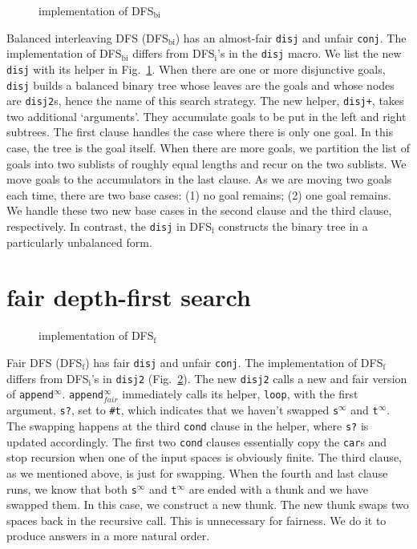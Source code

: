 \documentclass[format=acmlarge, review=true, authordraft=true]{acmart}
\newcommand{\conj}{\texttt{conj}}
\newcommand{\disj}{\texttt{disj}}
\newcommand{\DFSi }[0]{DFS$_\textrm{i}$}
\newcommand{\DFSf }[0]{DFS$_\textrm{f}$}
\newcommand{\DFSbi}[0]{DFS$_\textrm{bi}$}
\begin{document}
\begin{figure}
	
	\caption{implementation of \DFSbi{}}
	\label{balanced-disj}
\end{figure}

Balanced interleaving DFS (\DFSbi{}) has an almost-fair \disj{} and unfair 
\conj{}. The implementation of \DFSbi{} differs from 
\DFSi{}'s in the \disj{} macro. We list the new \disj{} with its 
helper in Fig.~\ref{balanced-disj}. When there are one or more disjunctive 
goals, \disj{} builds a balanced binary tree whose leaves are the goals and 
whose nodes are \texttt{disj2}s, hence the name of this search strategy. 
The new helper, \texttt{disj+}, takes two additional `arguments'. They 
accumulate goals to be put in the left and right subtrees. The first clause 
handles the case where there is only one goal. In this case, the tree is the 
goal itself. When there are more goals, we partition the list of goals 
into two sublists of roughly equal lengths and recur on the two sublists. We 
move goals to the accumulators in the last clause. As we are moving 
two goals each time, there are two base cases: (1) no goal remains; (2) one 
goal remains. We handle these two new base cases in the second clause and the 
third clause, respectively. In contrast, the \disj{} in \DFSi{} constructs the 
binary tree in a particularly unbalanced form.

\section{fair depth-first search}


\begin{figure}
	
	\caption{implementation of \DFSf{}}
	\label{fDFS}
\end{figure}

Fair DFS (\DFSf) has fair \disj{} and unfair \conj{}. The 
implementation of \DFSf{} differs from \DFSi{}'s in 
\texttt{disj2} (Fig.~\ref{fDFS}). The new \texttt{disj2} calls a new and 
fair version of \texttt{append$^\infty$}. \texttt{append$^\infty_{fair}$} 
immediately 
calls 
its helper, \texttt{loop}, with the first argument, \texttt{s?}, set to 
\texttt{\#{}t}, which indicates that we haven't swapped
\texttt{s$^\infty$} and \texttt{t$^\infty$}. The swapping 
happens at 
the third \texttt{cond} clause in the helper, where \texttt{s?} is updated 
accordingly. The first two \texttt{cond} clauses essentially copy the 
\texttt{car}s and stop recursion when one of the input spaces is obviously 
finite. The third clause, as we mentioned above, is just for swapping. When the 
fourth and last clause runs, we know that both \texttt{s$^\infty$} and 
\texttt{t$^\infty$} are ended with a thunk and we have swapped them. In this 
case, we construct a new thunk. The new thunk swaps two spaces back in the
recursive call. This is unnecessary for fairness. We do it to produce answers 
in a more natural order.
\end{document}
